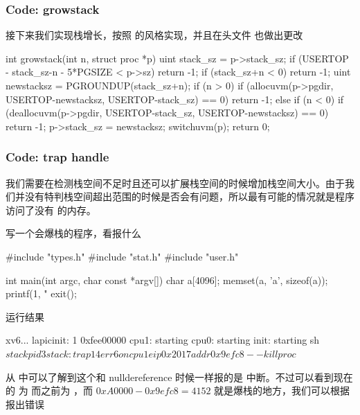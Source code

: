 \subsubsection{Code: growstack}

接下来我们实现栈增长，按照  的风格实现，并且在头文件  也做出更改



\begin{ccode}
    int growstack(int n, struct proc *p) {
        uint stack_sz = p->stack_sz;
        if (USERTOP - stack_sz-n - 5*PGSIZE < p->sz)
            return -1;
        if (stack_sz+n < 0)
            return -1;
        uint newstacksz = PGROUNDUP(stack_sz+n);
        if (n > 0) {
            if (allocuvm(p->pgdir, USERTOP-newstacksz, USERTOP-stack_sz) == 0)
            return -1;
        } else if (n < 0) {
            if (deallocuvm(p->pgdir, USERTOP-stack_sz, USERTOP-newstacksz) == 0)
            return -1;
        }
        p->stack_sz = newstacksz;
        switchuvm(p);
        return 0;
    }
\end{ccode}

\subsubsection{Code: trap handle}
 
我们需要在检测栈空间不足时且还可以扩展栈空间的时候增加栈空间大小。由于我们并没有特判栈空间超出范围的时候是否会有问题，所以最有可能的情况就是程序访问了没有  的内存。

写一个会爆栈的程序，看报什么 


\begin{ccode}
    #include "types.h"
    #include "stat.h"
    #include "user.h"

    int main(int argc, char const *argv[])
    {
        char a[4096];
        memset(a, 'a', sizeof(a));
        printf(1, "%
        exit();
    }
\end{ccode}

运行结果

\begin{textcode}
    xv6...
    lapicinit: 1 0xfee00000
    cpu1: starting
    cpu0: starting
    init: starting sh
    $ stack
    pid 3 stack: trap 14 err 6 on cpu 1 eip 0x2017 addr 0x9efc8--kill proc
    $ 
\end{textcode}

从  中可以了解到这个和 nulldereference 时候一样报的是  中断。不过可以看到现在的  为  而之前为 ，而 $0xA0000-0x9efc8 = 4152$ 就是爆栈的地方，我们可以根据  报出错误

